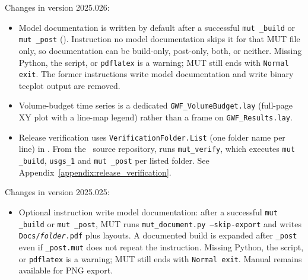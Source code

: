 \label{changes:2025.026}
Changes in version 2025.026:
\begin{itemize}
\item Model documentation is written by default after a successful \texttt{mut \_build} or \texttt{mut \_post} (). Instruction {\sf no model documentation} skips it for that MUT file only, so documentation can be build-only, post-only, both, or neither. Missing Python, the script, or \texttt{pdflatex} is a warning; MUT still ends with \texttt{Normal exit}. The former instructions {\sf write model documentation} and {\sf write binary tecplot output} are removed.
\item Volume-budget time series is a dedicated \texttt{GWF\_VolumeBudget.lay} (full-page XY plot with a line-map legend) rather than a frame on \texttt{GWF\_Results.lay}.
\item Release verification uses \texttt{VerificationFolder.List} (one folder name per line) in . From the \mut\ source repository,  runs \texttt{mut\_verify}, which executes \texttt{mut \_build}, \texttt{usgs\_1} and \texttt{mut \_post} per listed folder. See Appendix~\ref{appendix:release_verification}.
\end{itemize}

\label{changes:2025.025}
Changes in version 2025.025:
\begin{itemize}
\item Optional instruction {\sf write model documentation}: after a successful \texttt{mut \_build} or \texttt{mut \_post}, MUT runs \texttt{mut\_document.py --skip-export} and writes \texttt{Docs/\textit{folder}.pdf} plus layouts. A documented build is expanded after \texttt{\_post} even if \texttt{\_post.mut} does not repeat the instruction. Missing Python, the script, or \texttt{pdflatex} is a warning; MUT still ends with \texttt{Normal exit}. Manual  remains available for PNG export.
\end{itemize}

